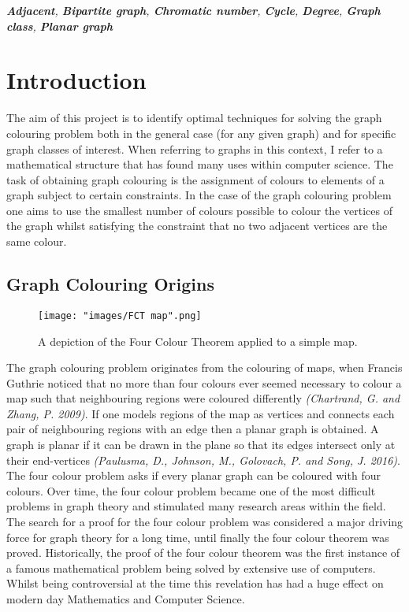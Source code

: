\documentclass[12pt,a4paper]{article}
\begin{document}
\begin{keywords}
\par \textit{\textbf{Adjacent}, \textbf{Bipartite graph}, \textbf{Chromatic number}, \textbf{Cycle}, \textbf{Degree}, \textbf{Graph class}, \textbf{Planar graph}}
\end{keywords}
\section{Introduction}
\noindent
The aim of this project is to identify optimal techniques for solving the graph colouring problem both in the general case (for any given graph) and for specific graph classes of interest. When referring to graphs in this context, I refer to a mathematical structure that has found many uses within computer science. The task of obtaining graph colouring is the assignment of colours to elements of a graph subject to certain constraints. In the case of the graph colouring problem one aims to use the smallest number of colours possible to colour the vertices of the graph whilst satisfying the constraint that no two adjacent vertices are the same colour.

\subsection*{Graph Colouring Origins}
\begin{wrapfigure}{h}{0.4\textwidth}
\texttt{[image: "images/FCT map".png]}
\caption{A depiction of the Four Colour Theorem applied to a simple map.}
\label{fig:fourcolour}
\end{wrapfigure}
\noindent
The graph colouring problem originates from the colouring of maps, when Francis Guthrie noticed that no more than four colours ever seemed necessary to colour a map such that neighbouring regions were coloured differently \textit{(Chartrand, G. and Zhang, P. 2009)}. If one models regions of the map as vertices and connects each pair of neighbouring regions with an edge then a planar graph is obtained. A graph is planar if it can be drawn in the plane so that its edges intersect only at their end-vertices \textit{(Paulusma, D., Johnson, M., Golovach, P. and Song, J. 2016)}. The four colour problem asks if every planar graph can be coloured with four colours.  Over time, the four colour problem became one of the most difficult problems in graph theory and stimulated many research areas within the field. The search for a proof for the four colour problem was considered a major driving force for graph theory for a long time, until finally the four colour theorem was proved.  Historically, the proof of the four colour theorem was the first instance of a famous mathematical problem being solved by extensive use of computers. Whilst being controversial at the time this revelation has had a huge effect on modern day Mathematics and Computer Science.
\end{document}

